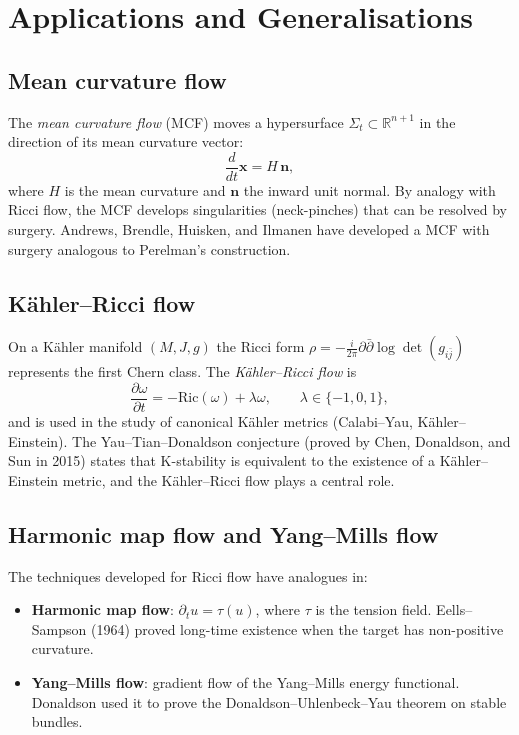 \documentclass[12pt,a4paper]{amsart}
\theoremstyle{definition}
\theoremstyle{remark}
\newcommand{\R}{\mathbb{R}}
\newcommand{\Ric}{\mathrm{Ric}}
\begin{document}
\section{Applications and Generalisations}
\label{sec:applications}

\subsection{Mean curvature flow}

The \emph{mean curvature flow} (MCF) moves a hypersurface $\Sigma_t \subset \R^{n+1}$
in the direction of its mean curvature vector:
\[
  \frac{d}{dt}\mathbf{x} = H\,\mathbf{n},
\]
where $H$ is the mean curvature and $\mathbf{n}$ the inward unit normal.
By analogy with Ricci flow, the MCF develops singularities (neck-pinches) that
can be resolved by surgery.  Andrews, Brendle, Huisken, and Ilmanen have
developed a MCF with surgery analogous to Perelman's construction.

\subsection{K\"{a}hler--Ricci flow}

On a K\"{a}hler manifold $(M, J, g)$ the Ricci form $\rho = -\frac{i}{2\pi}\partial\bar\partial\log\det(g_{i\bar j})$
represents the first Chern class.  The \emph{K\"{a}hler--Ricci flow} is
\[
  \frac{\partial \omega}{\partial t} = -\Ric(\omega) + \lambda\omega, \qquad \lambda \in \{-1, 0, 1\},
\]
and is used in the study of canonical K\"{a}hler metrics (Calabi--Yau,
K\"{a}hler--Einstein).  The Yau--Tian--Donaldson conjecture (proved by Chen,
Donaldson, and Sun in 2015) states that K-stability is equivalent to the
existence of a K\"{a}hler--Einstein metric, and the K\"{a}hler--Ricci flow
plays a central role.

\subsection{Harmonic map flow and Yang--Mills flow}

The techniques developed for Ricci flow have analogues in:
\begin{itemize}
  \item \textbf{Harmonic map flow}: $\partial_t u = \tau(u)$, where $\tau$ is
    the tension field.  Eells--Sampson (1964) proved long-time existence when
    the target has non-positive curvature.
  \item \textbf{Yang--Mills flow}: gradient flow of the Yang--Mills energy
    functional.  Donaldson used it to prove the Donaldson--Uhlenbeck--Yau
    theorem on stable bundles.
\end{itemize}
\end{document}

